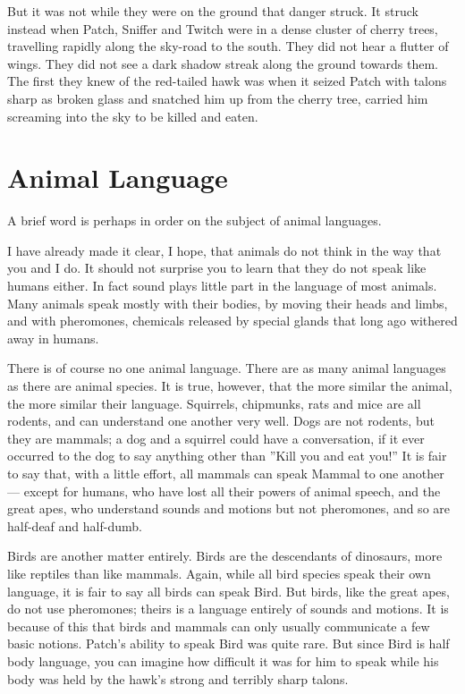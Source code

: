 \documentclass[12pt]{book}
\begin{document}
But it was not while they were on the ground that danger struck. It
struck instead when Patch, Sniffer and Twitch were in a dense cluster
of cherry trees, travelling rapidly along the sky-road to the
south. They did not hear a flutter of wings. They did not see a dark
shadow streak along the ground towards them. The first they knew of
the red-tailed hawk was when it seized Patch with talons sharp as
broken glass and snatched him up from the cherry tree, carried him
screaming into the sky to be killed and eaten.


\section{Animal Language}

A brief word is perhaps in order on the subject of animal languages.

I have already made it clear, I hope, that animals do not think in the
way that you and I do. It should not surprise you to learn that they
do not speak like humans either. In fact sound plays little part in
the language of most animals. Many animals speak mostly with their
bodies, by moving their heads and limbs, and with pheromones,
chemicals released by special glands that long ago withered away in
humans.

There is of course no one animal language. There are as many animal
languages as there are animal species. It is true, however, that the
more similar the animal, the more similar their language. Squirrels,
chipmunks, rats and mice are all rodents, and can understand one
another very well. Dogs are not rodents, but they are mammals; a dog
and a squirrel could have a conversation, if it ever occurred to the
dog to say anything other than ''Kill you and eat you!'' It is fair to
say that, with a little effort, all mammals can speak Mammal to one
another --- except for humans, who have lost all their powers of
animal speech, and the great apes, who understand sounds and motions
but not pheromones, and so are half-deaf and half-dumb.

Birds are another matter entirely. Birds are the descendants of
dinosaurs, more like reptiles than like mammals. Again, while all bird
species speak their own language, it is fair to say all birds can
speak Bird. But birds, like the great apes, do not use pheromones;
theirs is a language entirely of sounds and motions. It is because of
this that birds and mammals can only usually communicate a few basic
notions. Patch's ability to speak Bird was quite rare. But since Bird
is half body language, you can imagine how difficult it was for him to
speak while his body was held by the hawk's strong and terribly sharp
talons.
\end{document}
